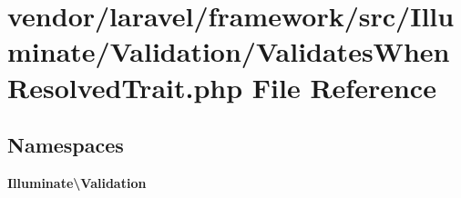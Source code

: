 \section{vendor/laravel/framework/src/\+Illuminate/\+Validation/\+Validates\+When\+Resolved\+Trait.php File Reference}
\label{_validates_when_resolved_trait_8php}
\subsection*{Namespaces}
\begin{DoxyCompactItemize}
\item 
 {\bf Illuminate\textbackslash{}\+Validation}
\end{DoxyCompactItemize}
